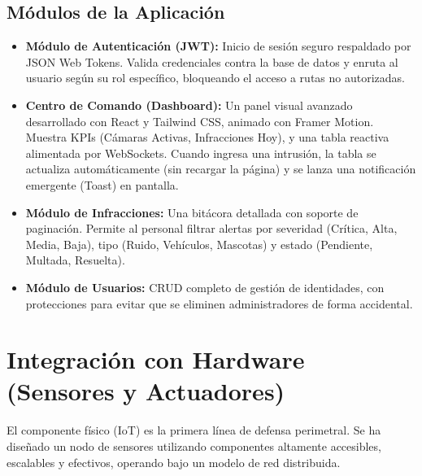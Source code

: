 \documentclass[12pt,a4paper]{article}
\begin{document}
\subsection{Módulos de la Aplicación}
\begin{itemize}
    \item \textbf{Módulo de Autenticación (JWT):} Inicio de sesión seguro respaldado por JSON Web Tokens. Valida credenciales contra la base de datos y enruta al usuario según su rol específico, bloqueando el acceso a rutas no autorizadas.
    \item \textbf{Centro de Comando (Dashboard):} Un panel visual avanzado desarrollado con React y Tailwind CSS, animado con Framer Motion. Muestra KPIs (Cámaras Activas, Infracciones Hoy), y una tabla reactiva alimentada por WebSockets. Cuando ingresa una intrusión, la tabla se actualiza automáticamente (sin recargar la página) y se lanza una notificación emergente (Toast) en pantalla.
    \item \textbf{Módulo de Infracciones:} Una bitácora detallada con soporte de paginación. Permite al personal filtrar alertas por severidad (Crítica, Alta, Media, Baja), tipo (Ruido, Vehículos, Mascotas) y estado (Pendiente, Multada, Resuelta).
    \item \textbf{Módulo de Usuarios:} CRUD completo de gestión de identidades, con protecciones para evitar que se eliminen administradores de forma accidental.
\end{itemize}

\section{Integración con Hardware (Sensores y Actuadores)}
El componente físico (IoT) es la primera línea de defensa perimetral. Se ha diseñado un nodo de sensores utilizando componentes altamente accesibles, escalables y efectivos, operando bajo un modelo de red distribuida.
\end{document}
